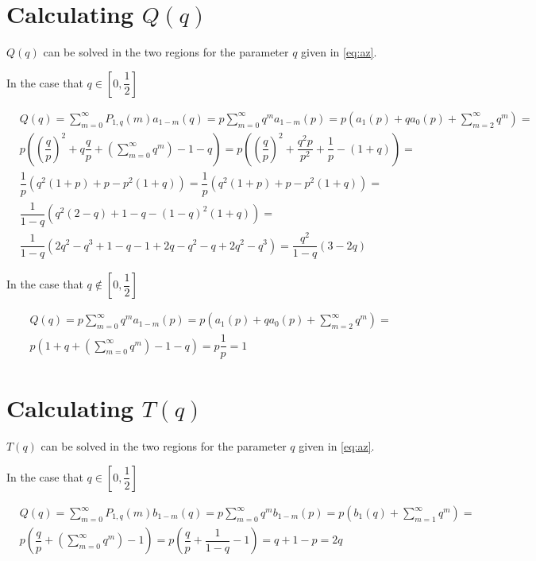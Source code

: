 \documentclass[letterpaper,12pt]{report}
\theoremstyle{plain}
\theoremstyle{definition}
\begin{document}
\section{Calculating $\mathit{Q}(q)$ } \label{app:calcqofp} 

$\mathit{Q}(q)$  can be solved in the two regions for the parameter $q$ given in \ref{eq:az}.

In the case  that $q\in [0,\dfrac{1}{2}]$

\begin{eqnarray}\label{eq:rpcalc}\nonumber
&\mathit{Q}(q)=\sum_{m=0}^{\infty}\mathit{P}_{1,q}(m)\mathit{a}_{1-m}(q)=p\sum_{m=0}^{\infty}q^m\mathit{a}_{1-m}(p)=p\left(
\mathit{a}_1(p)+q\mathit{a}_0(p)+\sum_{m=2}^{\infty}q^m
 \right)=\\\nonumber
 &p\left(
\left(\dfrac{q}{p}\right)^2+q\dfrac{q}{p}+\left(\sum_{m=0}^{\infty}q^m\right)-1-q
 \right) 
 =p\left(
\left(\dfrac{q}{p}\right)^2+\dfrac{q^2p}{p^2}+\dfrac{1}{p}-(1+q)
 \right)=\\\nonumber
&\dfrac{1}{p}\left(
q^2(1+p)+p-p^2(1+q)
\right) 
 =\dfrac{1}{p}
\left(q^2(1+p)+p-p^2(1+q)
 \right)=\\\nonumber
&\dfrac{1}{1-q}\left(
q^2(2-q)+1-q-(1-q)^2(1+q)
\right) 
 =\\\nonumber
 &\dfrac{1}{1-q}\left(
2q^2-q^3+1-q-1+2q-q^2 -q+2q^2-q^3
\right) = \dfrac{q^2}{1-q}\left(
3-2q
\right)
\end{eqnarray}

In the case  that $q\notin [0,\dfrac{1}{2}]$

\begin{eqnarray}\nonumber
&\mathit{Q}(q)=p\sum_{m=0}^{\infty}q^m\mathit{a}_{1-m}(p)=p\left(
\mathit{a}_1(p)+q\mathit{a}_0(p)+\sum_{m=2}^{\infty}q^m
 \right)=\\\nonumber
 &p
\left(1+q+\left(\sum_{m=0}^{\infty}q^m\right)-1-q
 \right) 
 =p\dfrac{1}{p}=1
\end{eqnarray}

\section{Calculating $\mathit{T}(q)$ } \label{app:calctofp} 

$\mathit{T}(q)$  can be solved in the two regions for the parameter $q$ given in \ref{eq:az}.

In the case  that $q\in [0,\dfrac{1}{2}]$

\begin{eqnarray}\label{eq:rpcalc}\nonumber
&\mathit{Q}(q)=\sum_{m=0}^{\infty}\mathit{P}_{1,q}(m)\mathit{b}_{1-m}(q)=p\sum_{m=0}^{\infty}q^m\mathit{b}_{1-m}(p)=p\left(
\mathit{b}_1(q)+\sum_{m=1}^{\infty}q^m
 \right)=\\\nonumber
 &p\left(
\dfrac{q}{p}+\left(\sum_{m=0}^{\infty}q^m\right)-1
 \right) 
 =p\left(
\dfrac{q}{p}+\dfrac{1}{1-q}-1
 \right)=q+1-p=2q\\\nonumber
\end{eqnarray}
\end{document}
